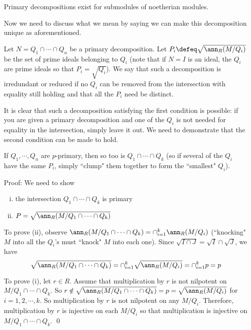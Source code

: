\begin{cor}
Primary decompositions exist for submodules of noetherian modules.
\end{cor} 

Now we need to discuss what we mean by saying we can make this decomposition unique as aforementioned. 

\begin{dfn}[Irredundant]
Let $N=Q_1 \cap \cdots \cap Q_n$ be a primary decomposition. Let $P_i \defeq \sqrt{\ann_R(M/Q_i)}$ be the set of prime ideals belonging to $Q_i$ (note that if $N=I$ is an ideal, the $Q_i$ are prime ideals so that $P_i=\sqrt{Q_i}$). We say that such a decomposition is irredundant or reduced if no $Q_i$ can be removed from the intersection with equality still holding and that all the $P_i$ need be distinct. 
\end{dfn}

It is clear that such a decomposition satisfying the first condition is possible: if you are given a primary decomposition and one of the $Q_i$ is not needed for equality in the intersection, simply leave it out. We need to demonstrate that the second condition can be made to hold. 

\begin{lem}
If $Q_1,\cdots,Q_n$ are $p$-primary, then so too is $Q_1 \cap \cdots \cap Q_k$ (so if several of the $Q_i$ have the same $P_i$, simply ``clump" them together to form the ``smallest" $Q_i$).
\end{lem}

\noindent Proof: We need to show
\begin{enumerate}[(i)]
\item the intersection $Q_1 \cap \cdots \cap Q_k$ is primary
\item $P=\sqrt{\ann_R(M/Q_1 \cap \cdots \cap Q_k)}$
\end{enumerate}



To prove (ii), observe $\ann_R(M/Q_1 \cap \cdots \cap Q_k)=\cap_{i=1}^k \ann_R(M/Q_i)$ (``knocking" $M$ into all the $Q_i$'s must ``knock" $M$ into each one). Since $\sqrt{I \cap J}=\sqrt{I} \cap \sqrt{J}$, we have
\[
\sqrt{\ann_R(M/Q_1 \cap \cdots \cap Q_k)}= \cap_{i=1}^k \sqrt{\ann_R(M/Q_i)}= \cap_{i=1}^k p=p
\]

To prove (i), let $r \in R$. Assume that multiplication by $r$ is not nilpotent on $M/Q_1 \cap \cdots \cap Q_k$. So $r \notin \sqrt{\ann_R(M/Q_1 \cap \cdots \cap Q_k)}=p=\sqrt{\ann_R(M/Q_i)}$ for $i=1,2,\cdots,k$. So multiplication by $r$ is not nilpotent on any $M/Q_i$. Therefore, multiplication by $r$ is injective on each $M/Q_i$ so that multiplication is injective on $M/Q_1 \cap \cdots \cap Q_k$. \qed \\

